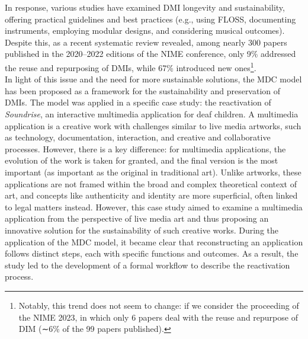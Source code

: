 In response, various studies have examined DMI longevity and sustainability, offering practical guidelines and best practices (e.g., using FLOSS, documenting instruments, employing modular designs, and considering musical outcomes). Despite this, as a recent systematic review \cite{masu2023nime} revealed, among nearly 300 papers published in the 2020–2022 editions of the NIME conference, only 9\% addressed the reuse and repurposing of DMIs, while 67\% introduced new ones\footnote{Notably, this trend does not seem to change: if we consider the proceeding of the NIME 2023, in which only 6 papers deal with the reuse and repurpose of DIM (∼6\% of the 99 papers published).}.\\
In light of this issue and the need for more sustainable solutions, the MDC model has been proposed as a framework for the sustainability and preservation of DMIs. The model was applied in a specific case study: the reactivation of \textit{Soundrise}, an interactive multimedia application for deaf children. A multimedia application is a creative work with challenges similar to live media artworks, such as technology, documentation, interaction, and creative and collaborative processes. However, there is a key difference: for multimedia applications, the evolution of the work is taken for granted, and the final version is the most important (as important as the original in traditional art). Unlike artworks, these applications are not framed within the broad and complex theoretical context of art, and concepts like authenticity and identity are more superficial, often linked to legal matters instead. However, this case study aimed to examine a multimedia application from the perspective of live media art and thus proposing an innovative solution for the sustainability of such creative works. During the application of the MDC model, it became clear that reconstructing an application follows distinct steps, each with specific functions and outcomes. As a result, the study led to the development of a formal workflow to describe the reactivation process.

